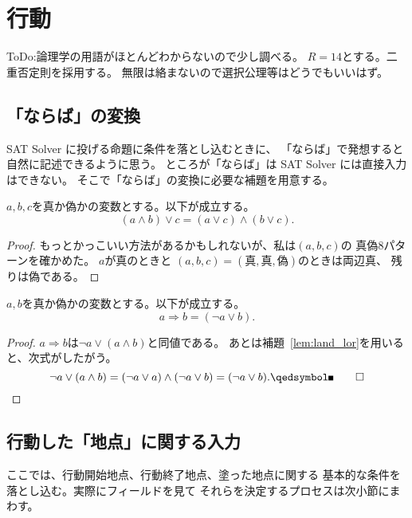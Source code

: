 
\section{行動}

ToDo:論理学の用語がほとんどわからないので少し調べる。
$R = 14$とする。二重否定則を採用する。
無限は絡まないので選択公理等はどうでもいいはず。

\subsection{「ならば」の変換}

SAT Solver に投げる命題に条件を落とし込むときに、
「ならば」で発想すると自然に記述できるように思う。
ところが「ならば」は SAT Solver には直接入力はできない。
そこで「ならば」の変換に必要な補題を用意する。

\begin{lem} \label{lem:land_lor}
 $a, b, c$を真か偽かの変数とする。以下が成立する。
 \[
 (a \land b) \lor c = (a \lor c) \land (b \lor c).
 \]
\end{lem}

\begin{proof}
 もっとかっこいい方法があるかもしれないが、私は$(a, b, c)$の
 真偽$8$パターンを確かめた。
 $a$が真のときと
 $(a, b, c) = (\text{真}, \text{真}, \text{偽})$のときは両辺真、
 残りは偽である。\qedhere
\end{proof}

\begin{cor} \label{cor:rightarrow}
 $a, b$を真か偽かの変数とする。以下が成立する。
 \[
  a \Rightarrow b = (\lnot a \lor b).
 \]
\end{cor}

\begin{proof}
 $a \Rightarrow b$は$\lnot a \lor (a \land b)$と同値である。
 あとは補題~\ref{lem:land_lor}を用いると、次式がしたがう。
 \[
  \lnot a \lor (a \land b) = (\lnot a \lor a) \land (\lnot a \lor b)
 = (\lnot a \lor b). \qedhere
 \]
\end{proof}

\subsection{行動した「地点」に関する入力}

ここでは、行動開始地点、行動終了地点、塗った地点に関する
基本的な条件を落とし込む。実際にフィールドを見て
それらを決定するプロセスは次小節にまわす。

